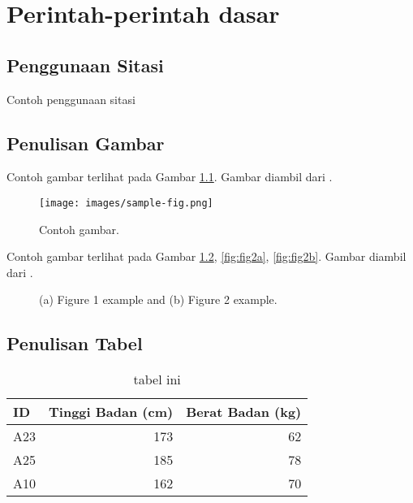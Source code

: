 \chapter{Perintah-perintah dasar}


\section{Penggunaan Sitasi}
Contoh penggunaan sitasi \cite{lukito2016,santosa2011user} \cite{lukito2016,santosa2011user,setiawan2014fuzzy,wibowo2014line}
\cite{setiawan2014fuzzy} \cite{wibowo2014line} \cite{marenda2016digitory} \cite{wibirama2013dual,wibowo2016clustering}

\section{Penulisan Gambar}

Contoh gambar terlihat pada Gambar \ref{Fig: Contoh gambar}. Gambar diambil dari \cite{wibowo2016clustering}.

\begin{figure}[h]
    \centering
    \texttt{[image: images/sample-fig.png]}
    \caption{Contoh gambar.}
    \label{Fig: Contoh gambar}
\end{figure}

Contoh gambar terlihat pada Gambar \ref{fig:fig2}, \ref{fig:fig2a}, \ref{fig:fig2b}. Gambar diambil dari \cite{wibowo2016clustering}.

\begin{figure}[h]
    \centering
        \hspace*{-1.2em}  %
    \caption{(a) Figure 1 example and (b) Figure 2 example.}
    \label{fig:fig2}
\end{figure}

\section{Penulisan Tabel}
\begin{table}[h]
    \caption{tabel ini}
    \vspace{0.5em}
    \centering
    \begin{tabular}{|l|r|r|}
        \hline
        ID & Tinggi Badan (cm) & Berat Badan (kg) \\
        \hline \hline
        A23 & 173 & 62 \\
        A25 & 185 & 78 \\
        A10 & 162 & 70 \\ \hline
    \end{tabular}
    \label{Tab: Tabel Tinggi Berat}
\end{table}


